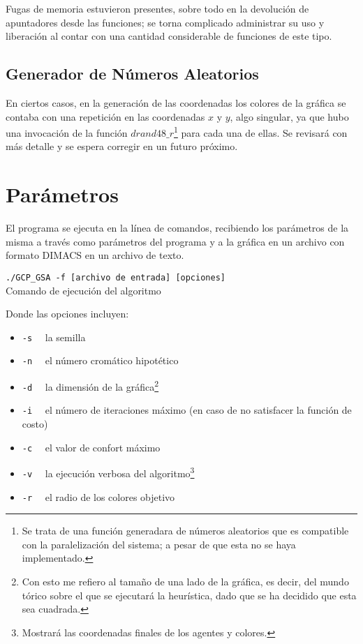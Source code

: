 \documentclass[a4paper]{report}
\begin{document}
Fugas de memoria estuvieron presentes, sobre todo en la devoluci\'on de apuntadores desde las
funciones; se torna complicado administrar su uso y liberaci\'on al contar con una cantidad
considerable de funciones de este tipo.

\subsection{Generador de N\'umeros Aleatorios}
En ciertos casos, en la generaci\'on de las coordenadas los colores de la gr\'afica
se contaba con una repetici\'on en las coordenadas $x$ y $y$, algo singular, ya que
hubo una invocaci\'on de la funci\'on $drand48\_r$\footnote{Se trata de una funci\'on
  generadara de n\'umeros aleatorios que es compatible con la paralelizaci\'on del sistema;
  a pesar de que esta no se haya implementado.} para cada una de ellas.
Se revisar\'a con m\'as detalle y se espera corregir en un futuro pr\'oximo.

\section{Par\'ametros}
El programa se ejecuta en la l\'inea de comandos, recibiendo los par\'ametros de la misma
a trav\'es como par\'ametros del programa y a la gr\'afica en un archivo con formato
DIMACS en un archivo de texto.

\begin{center}
  \texttt{./GCP\_GSA -f [archivo de entrada] [opciones]}\\
  \tiny{Comando de ejecuci\'on del algoritmo}
\end{center}

Donde las opciones incluyen:
\begin{itemize}
\item \texttt{-s} \ \ la semilla
\item \texttt{-n} \ \ el n\'umero crom\'atico hipot\'etico
\item \texttt{-d} \ \ la dimensi\'on de la gr\'afica\footnote{Con esto me refiero al
    tama\~no de una lado de la gr\'afica, es decir, del mundo t\'orico sobre el que
    se ejecutar\'a la heur\'istica, dado que se ha decidido que esta sea cuadrada.}
\item \texttt{-i} \ \ el n\'umero de iteraciones m\'aximo (en caso de no satisfacer
  la funci\'on de costo)
\item \texttt{-c} \ \ el valor de confort m\'aximo
\item \texttt{-v} \ \ la ejecuci\'on verbosa del algoritmo\footnote{Mostrar\'a las coordenadas
    finales de los agentes y colores.}
  \item \texttt{-r} \ \ el radio de los colores objetivo
\end{itemize}
\end{document}
